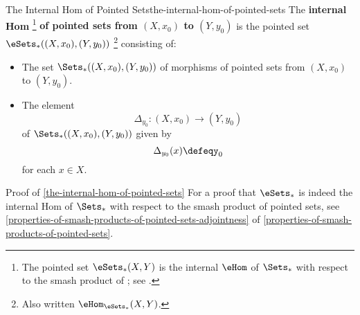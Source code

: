 \begin{definition}{The Internal Hom of Pointed Sets}{the-internal-hom-of-pointed-sets}%
    The \textbf{internal Hom}%
    \footnote{%
        The pointed set $\eSets_{*}(X,Y)$ is the internal $\eHom$ of $\Sets_{*}$ with respect to the smash product of ; see .
    } %
    \textbf{of pointed sets from $(X,x_{0})$ to $(Y,y_{0})$} is the pointed set $\eSets_{*}((X,x_{0}),(Y,y_{0}))$%
    \footnote{%
        Also written $\eHom_{\eSets_{*}}(X,Y)$.
        \par\vspace*{\TCBBoxCorrection}
    } %
    consisting of:
    \begin{itemize}
        \item{}The set $\Sets_{*}((X,x_{0}),(Y,y_{0}))$ of morphisms of pointed sets from $(X,x_{0})$ to $(Y,y_{0})$.
        \item{}The element%
            \[%
                \Delta_{y_{0}}%
                \colon%
                (X,x_{0})%
                \to%
                (Y,y_{0})%
            \]%
            of $\Sets_{*}((X,x_{0}),(Y,y_{0}))$ given by
            \[
                \Delta_{y_{0}}(x)%
                \defeq%
                y_{0}%
            \]%
            for each $x\in X$.
    \end{itemize}
\end{definition}
\begin{Proof}{Proof of \cref{the-internal-hom-of-pointed-sets}}%
    For a proof that $\eSets_{*}$ is indeed the internal Hom of $\Sets_{*}$ with respect to the smash product of pointed sets, see \cref{properties-of-smash-products-of-pointed-sets-adjointness} of \cref{properties-of-smash-products-of-pointed-sets}.
\end{Proof}
